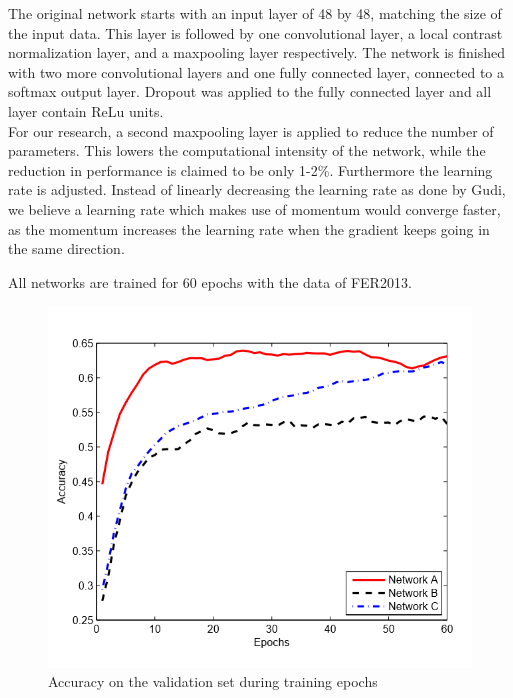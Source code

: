 \begin{enumerate}[(A)]
	The original network starts with an input layer of 48 by 48, matching the size of the input data. This layer is followed by one convolutional layer, a local contrast normalization layer, and a maxpooling layer respectively. The network is finished with two more convolutional layers and one fully connected layer, connected to a softmax output layer. Dropout was applied to the fully connected layer and all layer contain ReLu units.\\
	For our research, a second maxpooling layer is applied to reduce the number of parameters. This lowers the computational intensity of the network, while the reduction in performance is claimed to be only 1-2\%. Furthermore the learning rate is adjusted. Instead of linearly decreasing the learning rate as done by Gudi, we believe a learning rate which makes use of momentum would converge faster, as the momentum increases the learning rate when the gradient keeps going in the same direction.
\end{enumerate}

All networks are trained for 60 epochs with the data of FER2013.
\begin{figure}[h]
	\centering\includegraphics[scale=0.5]{images/training_validation.png}
	\caption{Accuracy on the validation set during training epochs}
\end{figure}

